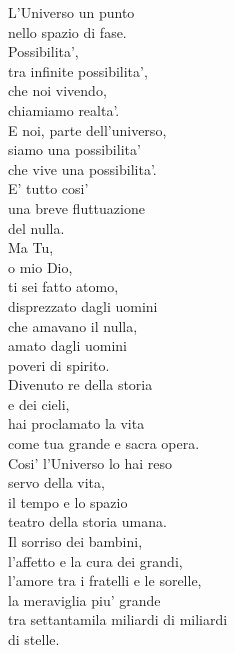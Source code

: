 \begin{haiku}
    L'Universo un punto\\
    nello spazio di fase.\\
    Possibilita',\\
    tra infinite possibilita',\\
    che noi vivendo,\\
    chiamiamo realta'.\\
    E noi, parte dell'universo,\\
    siamo una possibilita'\\
    che vive una possibilita'.\\
    E' tutto cosi' \\
    una breve fluttuazione \\
    del nulla.\\
    Ma Tu,\\
    o mio Dio,\\
    ti sei fatto atomo,\\
    disprezzato dagli uomini\\
    che amavano il nulla,\\
    amato dagli uomini\\
    poveri di spirito.\\
    Divenuto re della storia\\
    e dei cieli,\\
    hai proclamato la vita \\
    come tua grande e sacra opera.\\
    Cosi' l'Universo lo hai reso\\
    servo della vita,\\
    il tempo e lo spazio\\
    teatro della storia umana.\\
    Il sorriso dei bambini,\\
    l'affetto e la cura dei grandi,\\
    l'amore tra i fratelli e le sorelle,\\
    la meraviglia piu' grande\\
    tra settantamila miliardi di miliardi\\
    di stelle.\\
\end{haiku}


